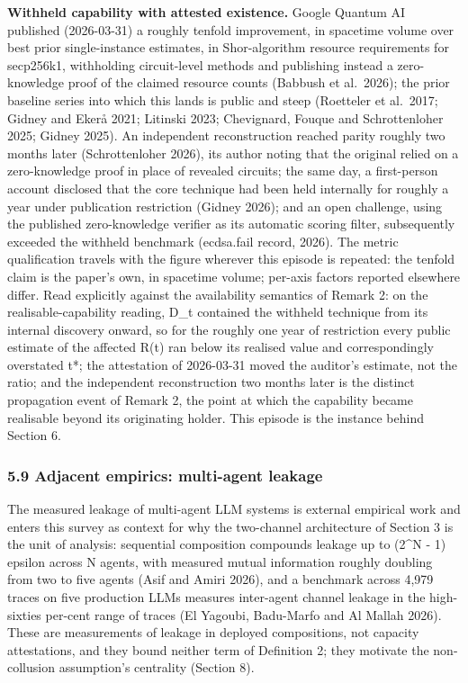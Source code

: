 \documentclass[
]{llncs}
\begin{document}
\textbf{Withheld capability with attested existence.} Google Quantum AI
published (2026-03-31) a roughly tenfold improvement, in spacetime
volume over best prior single-instance estimates, in Shor-algorithm
resource requirements for secp256k1, withholding circuit-level methods
and publishing instead a zero-knowledge proof of the claimed resource
counts (Babbush et al.~2026); the prior baseline series into which this
lands is public and steep (Roetteler et al.~2017; Gidney and Ekerå 2021;
Litinski 2023; Chevignard, Fouque and Schrottenloher 2025; Gidney 2025).
An independent reconstruction reached parity roughly two months later
(Schrottenloher 2026), its author noting that the original relied on a
zero-knowledge proof in place of revealed circuits; the same day, a
first-person account disclosed that the core technique had been held
internally for roughly a year under publication restriction (Gidney
2026); and an open challenge, using the published zero-knowledge
verifier as its automatic scoring filter, subsequently exceeded the
withheld benchmark (ecdsa.fail record, 2026). The metric qualification
travels with the figure wherever this episode is repeated: the tenfold
claim is the paper's own, in spacetime volume; per-axis factors reported
elsewhere differ. Read explicitly against the availability semantics of
Remark 2: on the realisable-capability reading, D\_t contained the
withheld technique from its internal discovery onward, so for the
roughly one year of restriction every public estimate of the affected
R(t) ran below its realised value and correspondingly overstated t*; the
attestation of 2026-03-31 moved the auditor's estimate, not the ratio;
and the independent reconstruction two months later is the distinct
propagation event of Remark 2, the point at which the capability became
realisable beyond its originating holder. This episode is the instance
behind Section 6.

\subsubsection{5.9 Adjacent empirics: multi-agent
leakage}\label{adjacent-empirics-multi-agent-leakage}

The measured leakage of multi-agent LLM systems is external empirical
work and enters this survey as context for why the two-channel
architecture of Section 3 is the unit of analysis: sequential
composition compounds leakage up to (2\^{}N - 1) epsilon across N
agents, with measured mutual information roughly doubling from two to
five agents (Asif and Amiri 2026), and a benchmark across 4,979 traces
on five production LLMs measures inter-agent channel leakage in the
high-sixties per-cent range of traces (El Yagoubi, Badu-Marfo and Al
Mallah 2026). These are measurements of leakage in deployed
compositions, not capacity attestations, and they bound neither term of
Definition 2; they motivate the non-collusion assumption's centrality
(Section 8).
\end{document}
